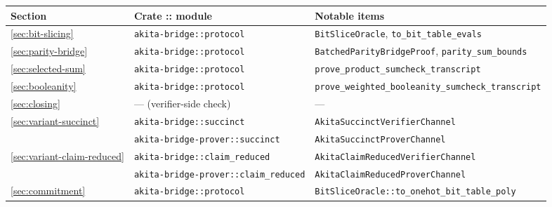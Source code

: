 \documentclass[11pt,a4paper]{article}
\theoremstyle{definition}
\theoremstyle{remark}
\begin{document}
\begin{table}[h]
\small
\begin{tabular}{lll}
\toprule
Section & Crate :: module                                & Notable items \\
\midrule
\ref{sec:bit-slicing}        & \verb|akita-bridge::protocol|     & \verb|BitSliceOracle|, \verb|to_bit_table_evals| \\
\ref{sec:parity-bridge}      & \verb|akita-bridge::protocol|     & \verb|BatchedParityBridgeProof|, \verb|parity_sum_bounds| \\
\ref{sec:selected-sum}       & \verb|akita-bridge::protocol|     & \verb|prove_product_sumcheck_transcript| \\
\ref{sec:booleanity}         & \verb|akita-bridge::protocol|     & \verb|prove_weighted_booleanity_sumcheck_transcript| \\
\ref{sec:closing}            & --- (verifier-side check)         & --- \\
\ref{sec:variant-succinct}   & \verb|akita-bridge::succinct|     & \verb|AkitaSuccinctVerifierChannel| \\
                             & \verb|akita-bridge-prover::succinct|  & \verb|AkitaSuccinctProverChannel| \\
\ref{sec:variant-claim-reduced} & \verb|akita-bridge::claim_reduced| & \verb|AkitaClaimReducedVerifierChannel| \\
                             & \verb|akita-bridge-prover::claim_reduced| & \verb|AkitaClaimReducedProverChannel| \\
\ref{sec:commitment}         & \verb|akita-bridge::protocol|     & \verb|BitSliceOracle::to_onehot_bit_table_poly| \\
\bottomrule
\end{tabular}
\end{table}
\end{document}
